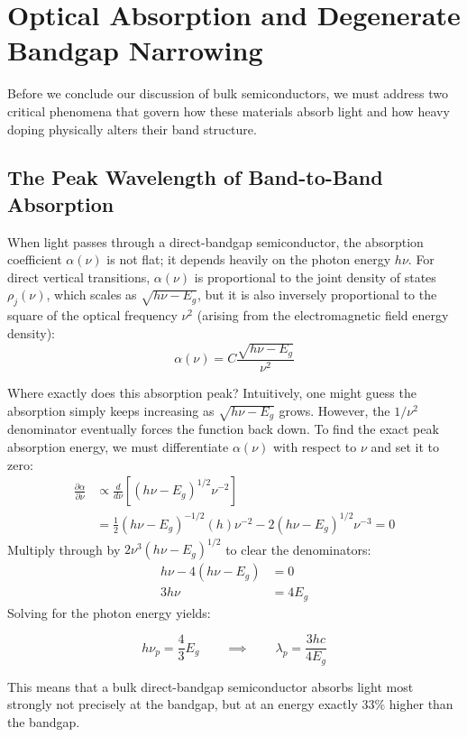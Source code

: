 \section{Optical Absorption and Degenerate Bandgap Narrowing}

Before we conclude our discussion of bulk semiconductors, we must address two critical phenomena that govern how these materials absorb light and how heavy doping physically alters their band structure.

\subsection{The Peak Wavelength of Band-to-Band Absorption}

When light passes through a direct-bandgap semiconductor, the absorption coefficient $\alpha(\nu)$ is not flat; it depends heavily on the photon energy $h\nu$. For direct vertical transitions, $\alpha(\nu)$ is proportional to the joint density of states $\rho_j(\nu)$, which scales as $\sqrt{h\nu - E_g}$, but it is also inversely proportional to the square of the optical frequency $\nu^2$ (arising from the electromagnetic field energy density):
\begin{equation*}
    \alpha(\nu) = C \frac{\sqrt{h\nu - E_g}}{\nu^2}
\end{equation*}

Where exactly does this absorption peak? Intuitively, one might guess the absorption simply keeps increasing as $\sqrt{h\nu - E_g}$ grows. However, the $1/\nu^2$ denominator eventually forces the function back down. To find the exact peak absorption energy, we must differentiate $\alpha(\nu)$ with respect to $\nu$ and set it to zero:
\begin{align*}
    \frac{\partial \alpha}{\partial \nu} & \propto \frac{d}{d\nu}\left[ (h\nu - E_g)^{1/2} \nu^{-2} \right]              \\
                                         & = \frac{1}{2}(h\nu - E_g)^{-1/2}(h)\nu^{-2} - 2(h\nu - E_g)^{1/2}\nu^{-3} = 0
\end{align*}
Multiply through by $2\nu^3 (h\nu - E_g)^{1/2}$ to clear the denominators:
\begin{align*}
    h\nu - 4(h\nu - E_g) & = 0    \\
    3h\nu                & = 4E_g
\end{align*}
Solving for the photon energy yields:
\begin{keyresult}
    \begin{equation}
        h\nu_p = \frac{4}{3}E_g \qquad \implies \qquad \lambda_p = \frac{3hc}{4E_g}
    \end{equation}
\end{keyresult}
This means that a bulk direct-bandgap semiconductor absorbs light most strongly not precisely at the bandgap, but at an energy exactly $33\%$ higher than the bandgap.

